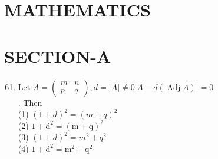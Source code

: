\documentclass[10pt]{article}
\begin{document}
\section*{MATHEMATICS}
\section*{SECTION-A}
\begin{enumerate}
  \setcounter{enumi}{60}
  \item Let \(A=\left(\begin{array}{cc}m & n \\ p & q\end{array}\right), d=|A| \neq 0|A-d(\operatorname{Adj} A)|=0\)\\
. Then\\
(1) \((1+d)^{2}=(m+q)^{2}\)\\
(2) \(1+\mathrm{d}^{2}=(\mathrm{m}+\mathrm{q})^{2}\)\\
(3) \((1+d)^{2}=m^{2}+q^{2}\)\\
(4) \(1+\mathrm{d}^{2}=\mathrm{m}^{2}+\mathrm{q}^{2}\)
\end{enumerate}
\end{document}
